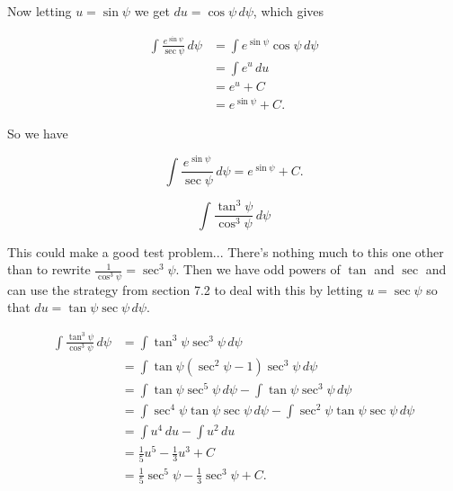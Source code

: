 \documentclass[12pt, letterpaper]{article}
\begin{document}
Now letting $u = \sin{\psi}$ we get $du = \cos{\psi} \, d\psi$, which gives

\begin{equation*}
\begin{aligned}
\int \frac{e^{\sin{\psi}}}{\sec{\psi}} \, d\psi
  &= \int e^{\sin{\psi}}\cos{\psi} \, d\psi \\[0.2in]
  &= \int e^{u}\, du \\[0.2in]
  &= e^u + C \\[0.2in]
  &= e^{\sin{\psi}} + C.
\end{aligned}
\end{equation*}

So we have

\begin{equation*}
\boxed
{
\int \frac{e^{\sin{\psi}}}{\sec{\psi}} \, d\psi
  = e^{\sin{\psi}} + C.
}
\end{equation*}





\newpage

$$ \int \frac{\tan^3{\psi}}{\cos^3{\psi}} \, d\psi $$

This could make a good test problem... There's nothing much to this one other than to rewrite $\frac{1}{\cos^3{\psi}} = \sec^3{\psi}$. Then we have odd powers of $\tan$ and $\sec$ and can use the strategy from section 7.2 to deal with this by letting $u = \sec{\psi}$ so that $du = \tan{\psi}\sec{\psi} \, d\psi$.

\begin{equation*}
\begin{aligned}
\int \frac{\tan^3{\psi}}{\cos^3{\psi}} \, d\psi
  &= \int \tan^3{\psi}\sec^3{\psi} \, d\psi \\[0.2in]
  &= \int \tan{\psi}\left( \sec^2{\psi} - 1 \right) \sec^3{\psi} \, d\psi \\[0.2in]
  &= \int \tan{\psi} \sec^5{\psi} \, d\psi - \int \tan{\psi}\sec^3{\psi} \, d\psi \\[0.2in]
  &= \int \sec^4{\psi} \tan{\psi} \sec{\psi} \, d\psi - \int \sec^2{\psi} \tan{\psi}\sec{\psi} \, d\psi \\[0.2in]
  &= \int u^4 \, du - \int u^2 \, du \\[0.2in]
  &= \tfrac{1}{5}u^5 - \tfrac{1}{3}u^3 + C \\[0.2in]
  &= \tfrac{1}{5}\sec^5{\psi} - \tfrac{1}{3}\sec^3{\psi} + C. \\[0.2in]
\end{aligned}
\end{equation*}
\end{document}
